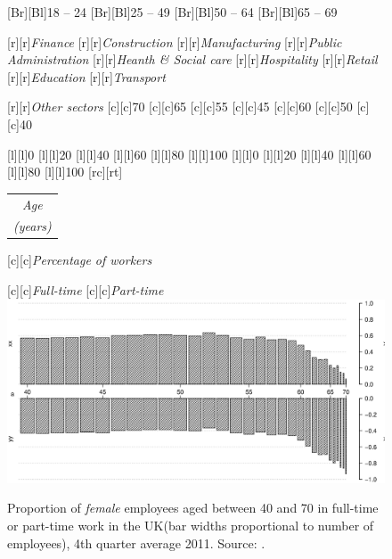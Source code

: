 \documentclass[11 pt, a4paper]{report}
\renewcommand{\arraystretch}{1.2}
\begin{document}
\begin{figure}[hbtp!]
[Br][Bl]{\small{18 -- 24}}
[Br][Bl]{\small{25 -- 49}}
[Br][Bl]{\small{50 -- 64}}
[Br][Bl]{\small{65 -- 69}}


[r][r]{\small{\emph{Finance}}}
[r][r]{\small{\emph{Construction}}}
[r][r]{\small{\emph{Manufacturing}}}
[r][r]{\small{\emph{Public Administration}}}
[r][r]{\small{\emph{Heanth \& Social care}}}
[r][r]{\small{\emph{Hospitality}}}
[r][r]{\small{\emph{Retail}}}
[r][r]{\small{\emph{Education}}}
[r][r]{\small{\emph{Transport}}}

[r][r]{\small{\emph{Other sectors}}}
[c][c]{\small{70}}
[c][c]{\small{65}}
[c][c]{\small{55}}
[c][c]{\small{45}}
[c][c]{\small{60}}
[c][c]{\small{50}}
[c][c]{\small{40}}

[l][l]{\small{0}}
[l][l]{\small{20}}
[l][l]{\small{40}}
[l][l]{\small{60}}
[l][l]{\small{80}}
[l][l]{\small{100}}
[l][l]{\small{0}}
[l][l]{\small{20}}
[l][l]{\small{40}}
[l][l]{\small{60}}
[l][l]{\small{80}}
[l][l]{\small{100}}
[rc][rt]{\small{
\renewcommand{\arraystretch}{0.8}
\begin{tabular}{@{}c}
\emph{Age}\\
\emph{(years)}
\end{tabular}}}[c][c]{\small{\emph{Percentage of workers}}}

[c][c]{\small{\emph{Full-time}}}
[c][c]{\small{\emph{Part-time}}}
\includegraphics[width=\textwidth]{../figures/Fig5.3.eps}
\caption{Proportion of \emph{female} employees aged between 40 and 70 in full-time or part-time work in the UK(bar widths proportional to number of employees), 4th quarter average 2011. Source: \citet{DWP2013}.}\label{Fig:54}
\end{figure}
\end{document}
